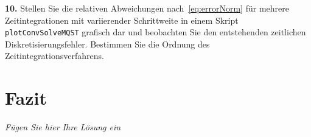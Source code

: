 \documentclass[Protokollheft.tex]{subfiles}
\begin{document}
  \begin{framed}
	\noindent \textbf{10.} Stellen Sie die relativen Abweichungen nach~\eqref{eq:errorNorm} für mehrere Zeitintegrationen mit
      variierender Schrittweite in einem Skript \lstinline{plotConvSolveMQST} grafisch dar und beobachten Sie den entstehenden zeitlichen Diskretisierungsfehler. Bestimmen Sie die Ordnung des Zeitintegrationsverfahrens.\label{exer:relDiffMQSFvsMQST}
\end{framed}





\section{Fazit}
\emph{Fügen Sie hier Ihre Lösung ein}
\end{document}
